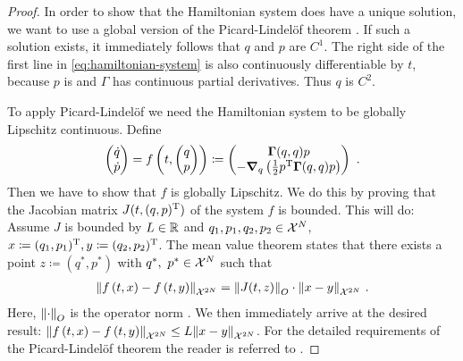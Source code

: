 \begin{proof}
	In order to show that the Hamiltonian system does have a unique solution, we want to use a global version of the Picard-Lindelöf theorem \cite[Theorem~1.2.3]{arino06}.
	If such a solution exists, it immediately follows that $q$ and $p$ are $C^1$.
	The right side of the first line in \cref{eq:hamiltonian-system} is also continuously differentiable by $t$, because $p$ is and $\Gamma$ has continuous partial derivatives.
	Thus $q$ is $C^2$.
	
	To apply Picard-Lindelöf we need the Hamiltonian system to be globally Lipschitz continuous.
	Define
	\begin{equation}
	\label{eq:hamiltonian-time-derivative}
		\begin{pmatrix}
			\dot{q}\\ \dot{p}
		\end{pmatrix}
		= f\left(t, \begin{pmatrix}q\\ p\end{pmatrix}\right) 
		\coloneqq 			
		\begin{pmatrix}
			\mathbf{\Gamma}(q, q)p\\ 
			-\grad_q \left(\frac{1}{2} p^\mathrm{T} \mathbf{\Gamma}(q, q) p\right)
		\end{pmatrix} \ .
	\end{equation}
	Then we have to show that $f$ is globally Lipschitz.
	We do this by proving that the Jacobian matrix $J(t, (q, p)^{\mathrm{T}})$ of the system $f$ is bounded.
	This will do:
	Assume $J$ is bounded by $L \in \mathbb{R}$ and $q_1, p_1, q_2, p_2 \in \mathcal{X}^N$, $x \coloneqq (q_1, p_1)^{\mathrm{T}}, y \coloneqq (q_2, p_2)^{\mathrm{T}}$.
	The mean value theorem states that there exists a point $z \coloneqq (q^\ast, p^\ast)$ with $q^\ast,\ p^\ast \in \mathcal{X}^N$ such that
	\begin{align}
		\norm{f\left(t, x\right) - f\left(t, y\right)}_{\mathcal{X}^{2N}}
		= \norm{J(t, z)}_O\cdot \norm{x-y}_{\mathcal{X}^{2N}} \ .
	\end{align}
	Here, $\norm{\cdot}_O$ is the operator norm \cite{conway07}.
	We then immediately arrive at the desired result:
	$\norm{f\left(t, x\right) - f\left(t, y\right)}_{\mathcal{X}^{2N}} \leq L \norm{x - y}_{\mathcal{X}^{2N}}$.
	For the detailed requirements of the Picard-Lindelöf theorem the reader is referred to \cite{arino06}.
	

\end{proof}
